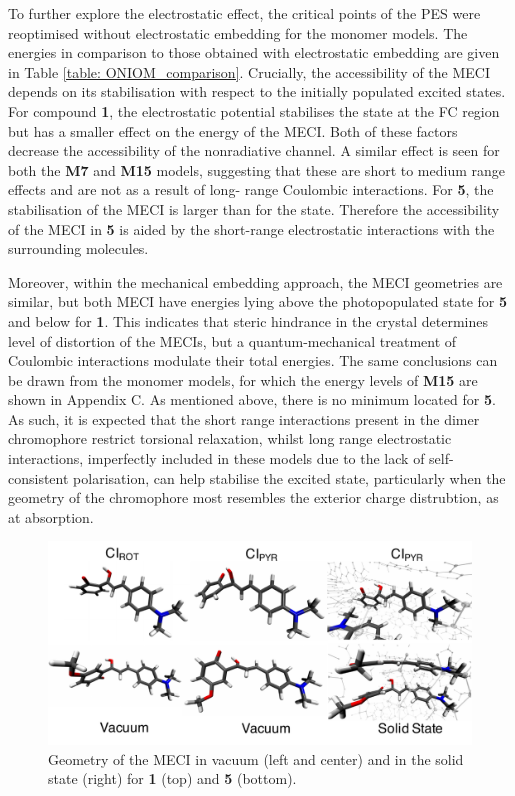 To further explore the electrostatic effect, the critical points of the \ac{PES} were reoptimised without electrostatic embedding for the monomer models. The energies in comparison to those obtained with electrostatic embedding are given in Table \ref{table: ONIOM_comparison}. Crucially, the accessibility of the MECI depends on its stabilisation with respect to the initially populated excited states. For compound \textbf{1}, the electrostatic potential stabilises the \sone{} state at the FC region but has a smaller effect on the energy of the MECI. Both of these factors decrease the accessibility of the nonradiative channel. A similar effect is seen for both the \textbf{M7} and \textbf{M15} models, suggesting that these are short to medium range effects and are not as a result of long- range Coulombic interactions. For \textbf{5}, the stabilisation of the MECI is larger than for the \sone{} state. Therefore the accessibility of the MECI in \textbf{5} is aided by the short-range electrostatic interactions with the surrounding molecules. 

Moreover, within the mechanical embedding approach, the MECI geometries are similar, but both MECI have energies lying above the photopopulated state for \textbf{5} and below for \textbf{1}. This indicates that steric hindrance in the crystal determines level of distortion of the MECIs, but a quantum-mechanical treatment of Coulombic interactions modulate their total energies. The same conclusions can be drawn from the monomer models, for which the energy levels of \textbf{M15} are shown in Appendix C. As mentioned above, there is  no \Estar{} minimum located for \textbf{5}. As such, it is expected that the short range interactions present in the dimer chromophore restrict torsional relaxation, whilst long range electrostatic interactions, imperfectly included in these models due to the lack of self-consistent polarisation, can help stabilise the excited state, particularly when the geometry of the chromophore most resembles the exterior charge distrubtion, as at absorption.

\begin{figure}
\centering
  \includegraphics[width=0.8\linewidth]{4IntraInterInteractions/HC_1_5_conicals.pdf}
  \caption[Comparison of vacuum and solid state conical intersections]{Geometry of the \Kstar{} MECI in vacuum (left and center) and in the solid state (right) for \textbf{1} (top) and \textbf{5} (bottom).}
  \label{figure: HC_1_5_conicals}
\end{figure}

